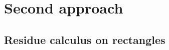 



% 
% 
% 
% 
% 
% 
% 
% 
% 
% 
% 
% 
% 
% 












\chapter{Second approach}

\section{Residue calculus on rectangles}

